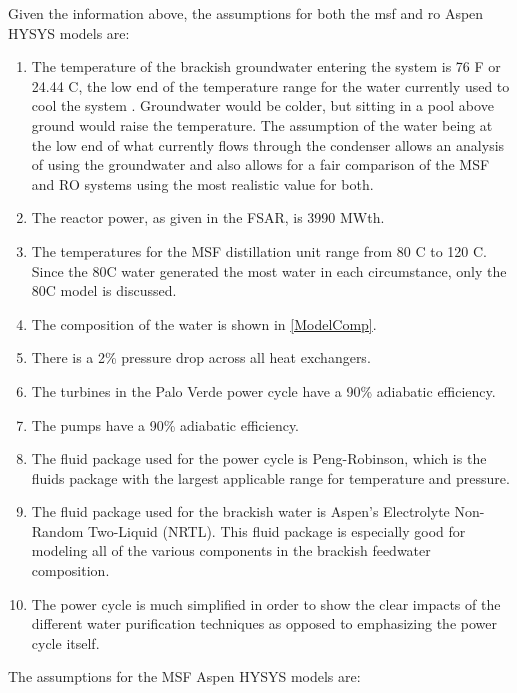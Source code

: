 Given the information above, the assumptions for both the \ac{msf} and \ac{ro} Aspen HYSYS models are:
\begin{enumerate}
\item The temperature of the brackish groundwater entering the system is 76 \degree F or 24.44 \degree C, the low end of the temperature range for the water currently used to cool the system \cite{Brown2018}. Groundwater would be colder, but sitting in a pool above ground would raise the temperature. The assumption of the water being at the low end of what currently flows through the condenser allows an analysis of using the groundwater and also allows for a fair comparison of the MSF and RO systems using the most realistic value for both.
\item The reactor power, as given in the FSAR, is 3990 MWth.
\item The temperatures for the MSF distillation unit range from 80 \degree C to 120 \degree C. Since the 80\degree C water generated the most water in each circumstance, only the 80\degree C model is discussed.
\item The composition of the water is shown in \ref{ModelComp}.
\item There is a 2\% pressure drop across all heat exchangers.
\item The turbines in the Palo Verde power cycle have a 90\% adiabatic efficiency.
\item The pumps have a 90\% adiabatic efficiency.
\item The fluid package used for the power cycle is Peng-Robinson, which is the fluids package with the largest applicable range for temperature and pressure.
\item The fluid package used for the brackish water is Aspen's Electrolyte Non-Random Two-Liquid (NRTL). This fluid package is especially good for modeling all of the various components in the brackish feedwater composition.
\item The power cycle is much simplified in order to show the clear impacts of the different water purification techniques as opposed to emphasizing the power cycle itself.
\end{enumerate}

The assumptions for the MSF Aspen HYSYS models are:

